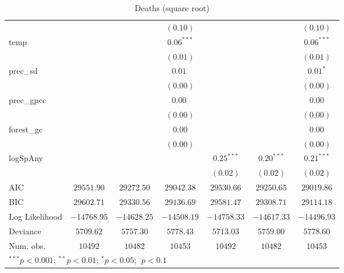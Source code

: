 \begin{sidewaystable}
\begin{center}
{\begin{tabular}{l c c c c c c}
                &               &               & $(0.10)$       &               &               & $(0.10)$      \\
temp            &               &               & $0.06^{***}$   &               &               & $0.06^{***}$  \\
                &               &               & $(0.01)$       &               &               & $(0.01)$      \\
prec\_sd        &               &               & $0.01^{\cdot}$ &               &               & $0.01^{*}$    \\
                &               &               & $(0.00)$       &               &               & $(0.00)$      \\
prec\_gpcc      &               &               & $0.00^{\cdot}$ &               &               & $0.00$        \\
                &               &               & $(0.00)$       &               &               & $(0.00)$      \\
forest\_gc      &               &               & $0.00$         &               &               & $0.00$        \\
                &               &               & $(0.00)$       &               &               & $(0.00)$      \\
logSpAny        &               &               &                & $0.25^{***}$  & $0.20^{***}$  & $0.21^{***}$  \\
                &               &               &                & $(0.02)$      & $(0.02)$      & $(0.02)$      \\
\hline
AIC             & $29551.90$    & $29272.50$    & $29042.38$     & $29530.66$    & $29250.65$    & $29019.86$    \\
BIC             & $29602.71$    & $29330.56$    & $29136.69$     & $29581.47$    & $29308.71$    & $29114.18$    \\
Log Likelihood  & $-14768.95$   & $-14628.25$   & $-14508.19$    & $-14758.33$   & $-14617.33$   & $-14496.93$   \\
Deviance        & $5709.62$     & $5757.30$     & $5778.43$      & $5713.03$     & $5759.00$     & $5778.60$     \\
Num. obs.       & $10492$       & $10482$       & $10453$        & $10492$       & $10482$       & $10453$       \\
\hline
\multicolumn{7}{l}{\scriptsize{$^{***}p<0.001$; $^{**}p<0.01$; $^{*}p<0.05$; $^{\cdot}p<0.1$}}
\end{tabular}
}
\caption{Deaths (square root)}
\label{sqrtDeaths}
\end{center}
\end{sidewaystable}

